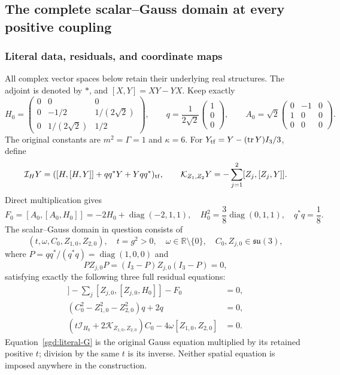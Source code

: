 \subsection{The complete scalar--Gauss domain at every positive coupling}
\label{q444:sgd:section}

\subsubsection{Literal data, residuals, and coordinate maps}

All complex vector spaces below retain their underlying real structures.
The adjoint is denoted by $*$, and $[X,Y]=XY-YX$. Keep exactly
\[
 H_0=\begin{pmatrix}0&0&0\\0&-1/2&1/(2\sqrt2)\\
 0&1/(2\sqrt2)&1/2\end{pmatrix},\qquad
 q=\frac1{2\sqrt2}\begin{pmatrix}1\\0\\0\end{pmatrix},\qquad
 A_0=\sqrt2\begin{pmatrix}0&-1&0\\1&0&0\\0&0&0\end{pmatrix}.
\]
The original constants are $m^2=\Gamma=1$ and $\kappa=6$.
For $Y_{\rm tf}=Y-(\operatorname{tr} Y)I_3/3$, define
\[
 \mathcal I_HY=([H,[H,Y]]+qq^*Y+Yqq^*)_{\rm tf},\qquad
 \mathcal K_{Z_1,Z_2}Y=-\sum_{j=1}^2[Z_j,[Z_j,Y]].
\]
Direct multiplication gives
\[
 F_0=[A_0,[A_0,H_0]]=-2H_0+\operatorname{diag}(-2,1,1),\quad
 H_0^2=\frac38\operatorname{diag}(0,1,1),\quad q^*q=\frac18.
\]
The scalar--Gauss domain in question consists of
\[
 (t,\omega,C_0,Z_{1,0},Z_{2,0}),\quad t=g^2>0,\quad
 \omega\in\mathbb R\setminus\{0\},\quad C_0,Z_{j,0}\in\mathfrak{su}(3),
\]
where $P=qq^*/(q^*q)=\operatorname{diag}(1,0,0)$ and
\[
 PZ_{j,0}P=(I_3-P)Z_{j,0}(I_3-P)=0,
\]
satisfying exactly the following three full residual equations:
\begin{align}
 [C_0,[C_0,H_0]]-\sum_j[Z_{j,0},[Z_{j,0},H_0]]-F_0&=0,
 \label{sgd:literal-H}\\
 (C_0^2-Z_{1,0}^2-Z_{2,0}^2)q+2q&=0,
 \label{sgd:literal-q}\\
 (t\mathcal I_{H_0}+2\mathcal K_{Z_{1,0},Z_{2,0}})C_0
             -4\omega[Z_{1,0},Z_{2,0}]&=0.
 \label{sgd:literal-G}
\end{align}
Equation~\eqref{sgd:literal-G} is the original Gauss equation multiplied
by its retained positive $t$; division by the same $t$ is its inverse.
Neither spatial equation is imposed anywhere in the construction.

